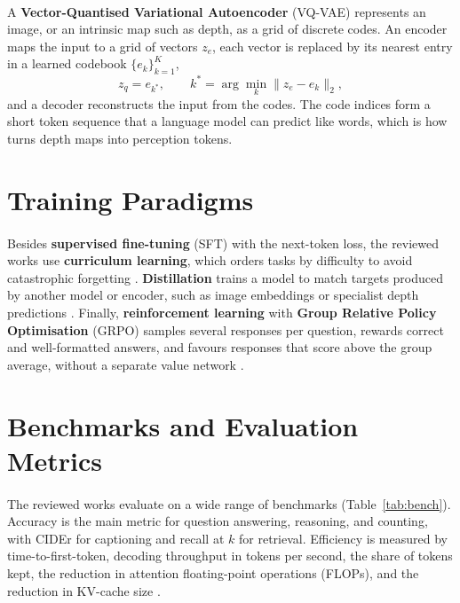 \documentclass[12pt,a4paper,final]{extreport}
\begin{document}
\paragraph{} A \textbf{Vector-Quantised Variational Autoencoder} (VQ-VAE) \cite{oord2017} represents an image, or an intrinsic map such as depth, as a grid of discrete codes. An encoder maps the input to a grid of vectors $z_e$, each vector is replaced by its nearest entry in a learned codebook $\{e_k\}_{k=1}^{K}$,
\begin{equation}
z_q=e_{k^{*}},\qquad k^{*}=\arg\min_{k}\big\|z_e-e_k\big\|_2,
\end{equation}
and a decoder reconstructs the input from the codes. The code indices form a short token sequence that a language model can predict like words, which is how \cite{p2} turns depth maps into perception tokens.

\section{Training Paradigms}

\paragraph{} Besides \textbf{supervised fine-tuning} (SFT) with the next-token loss, the reviewed works use \textbf{curriculum learning}, which orders tasks by difficulty to avoid catastrophic forgetting \cite{p2}. \textbf{Distillation} trains a model to match targets produced by another model or encoder, such as image embeddings \cite{p1} or specialist depth predictions \cite{p2,p4}. Finally, \textbf{reinforcement learning} with \textbf{Group Relative Policy Optimisation} (GRPO) \cite{shao2024} samples several responses per question, rewards correct and well-formatted answers, and favours responses that score above the group average, without a separate value network \cite{p1}.

\section{Benchmarks and Evaluation Metrics}

\paragraph{} The reviewed works evaluate on a wide range of benchmarks (Table~\ref{tab:bench}). Accuracy is the main metric for question answering, reasoning, and counting, with CIDEr for captioning and recall at $k$ for retrieval. Efficiency is measured by time-to-first-token, decoding throughput in tokens per second, the share of tokens kept, the reduction in attention floating-point operations (FLOPs), and the reduction in KV-cache size \cite{p3}.
\end{document}
